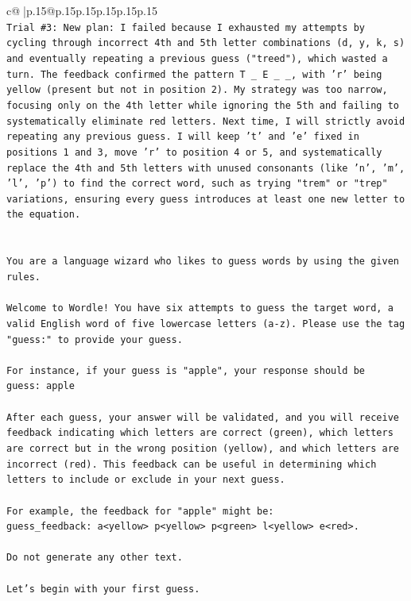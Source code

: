 \documentclass{article}
\begin{document}
{\begin{supertabular}{c@{$\;$}|p{.15\linewidth}@{}p{.15\linewidth}p{.15\linewidth}p{.15\linewidth}p{.15\linewidth}p{.15\linewidth}}
{{{\\ 
\texttt{Trial \#3: New plan: I failed because I exhausted my attempts by cycling through incorrect 4th and 5th letter combinations (d, y, k, s) and eventually repeating a previous guess ("treed"), which wasted a turn. The feedback confirmed the pattern T \_ E \_ \_, with 'r' being yellow (present but not in position 2). My strategy was too narrow, focusing only on the 4th letter while ignoring the 5th and failing to systematically eliminate red letters. Next time, I will strictly avoid repeating any previous guess. I will keep 't' and 'e' fixed in positions 1 and 3, move 'r' to position 4 or 5, and systematically replace the 4th and 5th letters with unused consonants (like 'n', 'm', 'l', 'p') to find the correct word, such as trying "trem" or "trep" variations, ensuring every guess introduces at least one new letter to the equation.} \\
\\ 
\\ 
\texttt{You are a language wizard who likes to guess words by using the given rules.} \\
\\ 
\texttt{Welcome to Wordle! You have six attempts to guess the target word, a valid English word of five lowercase letters (a{-}z). Please use the tag "guess:" to provide your guess.} \\
\\ 
\texttt{For instance, if your guess is "apple", your response should be} \\
\texttt{guess: apple} \\
\\ 
\texttt{After each guess, your answer will be validated, and you will receive feedback indicating which letters are correct (green), which letters are correct but in the wrong position (yellow), and which letters are incorrect (red). This feedback can be useful in determining which letters to include or exclude in your next guess.} \\
\\ 
\texttt{For example, the feedback for "apple" might be:} \\
\texttt{guess\_feedback: a<yellow> p<yellow> p<green> l<yellow> e<red>.} \\
\\ 
\texttt{Do not generate any other text.} \\
\\ 
\texttt{Let's begin with your first guess.} \\
            }
        }
    }
     \\ \\


\end{supertabular}}
\end{document}
